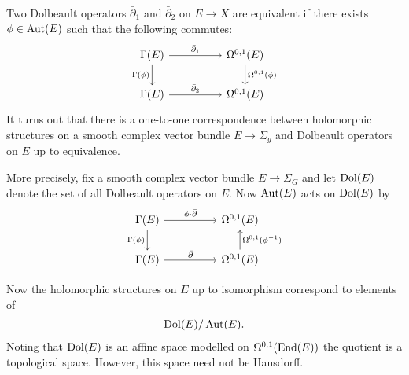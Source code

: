 \documentclass{article}
\begin{document}
Two Dolbeault operators $\bar\partial_1$ and $\bar\partial_2$ on
$E\to X$ are equivalent if there exists $\phi\in\operatorname{Aut}(E)$ such that
the following commutes:
\begin{equation*}
  \begin{tikzcd}
    {\Gamma(E)} && {\Omega^{0,1}(E)} \\
    {\Gamma(E)} && {\Omega^{0,1}(E)}
    \arrow["{\bar\partial_2}", from=2-1, to=2-3]
    \arrow["{\bar\partial_1}", from=1-1, to=1-3]
    \arrow["{\Gamma(\phi)}"', from=1-1, to=2-1]
    \arrow["{\Omega^{0,1}(\phi)}", from=1-3, to=2-3]
  \end{tikzcd}
\end{equation*}
It turns out that there is a one-to-one correspondence between
holomorphic structures on a smooth complex vector bundle $E\to\Sigma_g$
and Dolbeault operators on $E$ up to equivalence.

More precisely, fix a smooth complex vector bundle $E\to\Sigma_G$
and let $\operatorname{Dol}(E)$ denote the set of all Dolbeault operators on $E$.
Now $\operatorname{Aut}(E)$ acts on $\operatorname{Dol}(E)$ by
\begin{equation*}
  \begin{tikzcd}
    {\Gamma(E)} && {\Omega^{0,1}(E)} \\
    {\Gamma(E)} && {\Omega^{0,1}(E)}
    \arrow["\bar\partial", from=2-1, to=2-3]
    \arrow["\phi\cdot\bar\partial", from=1-1, to=1-3]
    \arrow["{\Gamma(\phi)}"', from=1-1, to=2-1]
    \arrow["{\Omega^{0,1}(\phi^{-1})}"', from=2-3, to=1-3]
  \end{tikzcd}
\end{equation*}

Now the holomorphic structures on $E$ up to isomorphism correspond to
elements of 
\begin{align*}
  \operatorname{Dol}(E)/\operatorname{Aut}(E).
\end{align*}
Noting that $\operatorname{Dol}(E)$ is an affine space modelled on $\Omega^{0,1}(\operatorname{End}(E))$
\cite{mccarthy2020}  the quotient
is a topological space. However, this space need not be Hausdorff.
\end{document}
